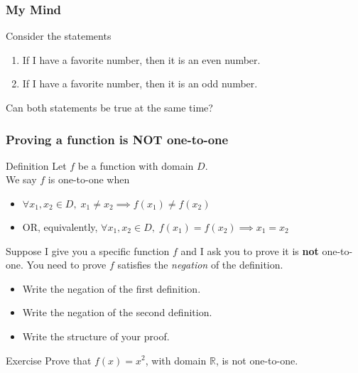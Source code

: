 \documentclass[14pt]{beamer}
\newcommand {\DS} [1] {${\displaystyle #1}$}
\newcommand {\R}{\mathbb{R}}
\newcommand{\p}{\pause}
\begin{document}
\begin{frame}
\frametitle{My Mind}
	Consider the statements
	\bigskip
	\begin{enumerate}
		\item If I have a favorite number, then it is an even number.
		\item If I have a favorite number, then it is an odd number.
	\end{enumerate}

	\vfill
	Can both statements be true at the same time?
\vfill
\end{frame}


\begin{frame}[t]
\fontsize{13}{13}\selectfont
\frametitle{Proving a function is NOT one-to-one}

\begin{block}{Definition}
Let $f$ be a function with domain $D$. \\
We say $f$ is one-to-one when 
	\begin{itemize} 
		\item   \hfill \DS{\forall x_1, x_2 \in D, \; x_1 \neq x_2 \implies  f(x_1) \neq f(x_2)}
		\item    OR, equivalently, \hfill  \DS{\forall x_1, x_2 \in D, \; f(x_1) = f(x_2) \implies x_1 = x_2}
	\end{itemize}
\end{block}

\vfill  \p

	Suppose I give you a specific function $f$ and I ask you to prove it is \textbf{not} one-to-one. \pause  You need to prove $f$ satisfies the \emph{negation} of the definition.
	\begin{itemize}
		\item  Write the negation of the first definition.
		\item  Write the negation of the second definition.
		\item  Write the structure of your proof. 
	\end{itemize}
	
\vfill	 \p

\begin{block}{Exercise}
	Prove that $f(x) =  x^2$, with domain $\R$, is not one-to-one.
\end{block}

\end{frame}
\end{document}
